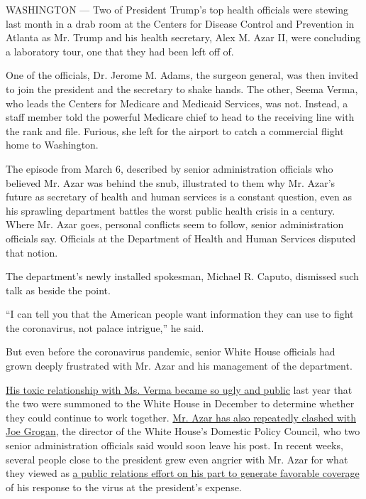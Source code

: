 WASHINGTON --- Two of President Trump's top health officials were
stewing last month in a drab room at the Centers for Disease Control and
Prevention in Atlanta as Mr. Trump and his health secretary, Alex M.
Azar II, were concluding a laboratory tour, one that they had been left
off of.

One of the officials, Dr. Jerome M. Adams, the surgeon general, was then
invited to join the president and the secretary to shake hands. The
other, Seema Verma, who leads the Centers for Medicare and Medicaid
Services, was not. Instead, a staff member told the powerful Medicare
chief to head to the receiving line with the rank and file. Furious, she
left for the airport to catch a commercial flight home to Washington.

The episode from March 6, described by senior administration officials
who believed Mr. Azar was behind the snub, illustrated to them why Mr.
Azar's future as secretary of health and human services is a constant
question, even as his sprawling department battles the worst public
health crisis in a century. Where Mr. Azar goes, personal conflicts seem
to follow, senior administration officials say. Officials at the
Department of Health and Human Services disputed that notion.

The department's newly installed spokesman, Michael R. Caputo, dismissed
such talk as beside the point.

``I can tell you that the American people want information they can use
to fight the coronavirus, not palace intrigue,'' he said.

But even before the coronavirus pandemic, senior White House officials
had grown deeply frustrated with Mr. Azar and his management of the
department.

\href{https://www.nytimes.com/2019/12/10/us/politics/trump-seema-verma-azar.html}{His
toxic relationship with Ms. Verma became so ugly and public} last year
that the two were summoned to the White House in December to determine
whether they could continue to work together.
\href{https://www.nytimes.com/2019/07/11/health/drug-prices-rebate-donald-trump.html}{Mr.
Azar has also repeatedly clashed with Joe Grogan}, the director of the
White House's Domestic Policy Council, who two senior administration
officials said would soon leave his post. In recent weeks, several
people close to the president grew even angrier with Mr. Azar for what
they viewed as
\href{https://www.nytimes.com/2020/03/07/us/politics/trump-coronavirus.html}{a
public relations effort on his part to generate favorable coverage} of
his response to the virus at the president's expense.

